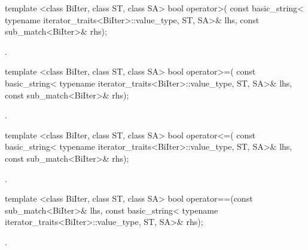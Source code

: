 %
%
\begin{itemdecl}
template <class BiIter, class ST, class SA>
  bool operator>(
    const basic_string<
      typename iterator_traits<BiIter>::value_type, ST, SA>& lhs,
    const sub_match<BiIter>& rhs);
\end{itemdecl}

\begin{itemdescr}
\pnum\returns  {}.
\end{itemdescr}

%
%
\begin{itemdecl}
template <class BiIter, class ST, class SA>
  bool operator>=(
    const basic_string<
      typename iterator_traits<BiIter>::value_type, ST, SA>& lhs,
    const sub_match<BiIter>& rhs);
\end{itemdecl}

\begin{itemdescr}
\pnum\returns  {}.
\end{itemdescr}

%
%
\begin{itemdecl}
template <class BiIter, class ST, class SA>
  bool operator<=(
    const basic_string<
      typename iterator_traits<BiIter>::value_type, ST, SA>& lhs,
    const sub_match<BiIter>& rhs);
\end{itemdecl}

\begin{itemdescr}
\pnum\returns  {}.
\end{itemdescr}

%
%
\begin{itemdecl}
template <class BiIter, class ST, class SA>
  bool operator==(const sub_match<BiIter>& lhs,
                  const basic_string<
                    typename iterator_traits<BiIter>::value_type, ST, SA>& rhs);
\end{itemdecl}

\begin{itemdescr}
\pnum\returns  {}.
\end{itemdescr}

